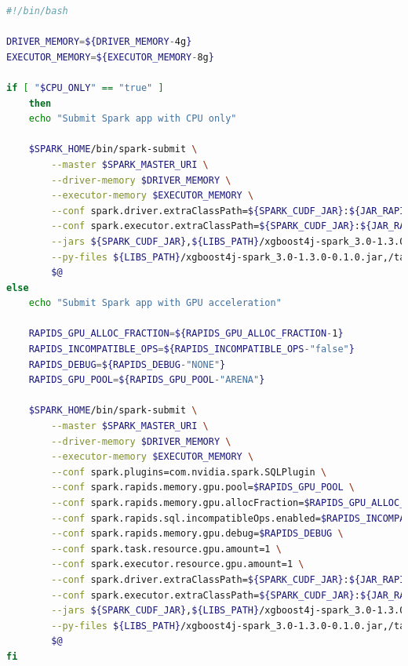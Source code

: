 \begin{lstlisting}[label=lst:appendix_spark-submit_script, caption=Custom submit script, language=sh]
#!/bin/bash
 
DRIVER_MEMORY=${DRIVER_MEMORY-4g}
EXECUTOR_MEMORY=${EXECUTOR_MEMORY-8g}
 
if [ "$CPU_ONLY" == "true" ]
    then
    echo "Submit Spark app with CPU only"
 
    $SPARK_HOME/bin/spark-submit \
        --master $SPARK_MASTER_URI \
        --driver-memory $DRIVER_MEMORY \
        --executor-memory $EXECUTOR_MEMORY \
        --conf spark.driver.extraClassPath=${SPARK_CUDF_JAR}:${JAR_RAPIDS}:${LIBS_PATH}/xgboost4j_3.0-1.3.0-0.1.0.jar:${LIBS_PATH}/xgboost4j-spark_3.0-1.3.0-0.1.0.jar \
        --conf spark.executor.extraClassPath=${SPARK_CUDF_JAR}:${JAR_RAPIDS}:${LIBS_PATH}/xgboost4j_3.0-1.3.0-0.1.0.jar:${LIBS_PATH}/xgboost4j-spark_3.0-1.3.0-0.1.0.jar \
        --jars ${SPARK_CUDF_JAR},${LIBS_PATH}/xgboost4j-spark_3.0-1.3.0-0.1.0.jar,${LIBS_PATH}/xgboost4j_3.0-1.3.0-0.1.0.jar,${JAR_RAPIDS} \
        --py-files ${LIBS_PATH}/xgboost4j-spark_3.0-1.3.0-0.1.0.jar,/tank/data/users/chh-ms/spark-xgboost-examples/examples/apps/python/samples.zip \
        $@
else
    echo "Submit Spark app with GPU acceleration"
 
    RAPIDS_GPU_ALLOC_FRACTION=${RAPIDS_GPU_ALLOC_FRACTION-1}
    RAPIDS_INCOMPATIBLE_OPS=${RAPIDS_INCOMPATIBLE_OPS-"false"}
    RAPIDS_DEBUG=${RAPIDS_DEBUG-"NONE"}
    RAPIDS_GPU_POOL=${RAPIDS_GPU_POOL-"ARENA"}
 
    $SPARK_HOME/bin/spark-submit \
        --master $SPARK_MASTER_URI \
        --driver-memory $DRIVER_MEMORY \
        --executor-memory $EXECUTOR_MEMORY \
        --conf spark.plugins=com.nvidia.spark.SQLPlugin \
        --conf spark.rapids.memory.gpu.pool=$RAPIDS_GPU_POOL \
        --conf spark.rapids.memory.gpu.allocFraction=$RAPIDS_GPU_ALLOC_FRACTION \
        --conf spark.rapids.sql.incompatibleOps.enabled=$RAPIDS_INCOMPATIBLE_OPS \
        --conf spark.rapids.memory.gpu.debug=$RAPIDS_DEBUG \
        --conf spark.task.resource.gpu.amount=1 \
        --conf spark.executor.resource.gpu.amount=1 \
        --conf spark.driver.extraClassPath=${SPARK_CUDF_JAR}:${JAR_RAPIDS}:${LIBS_PATH}/xgboost4j_3.0-1.3.0-0.1.0.jar:${LIBS_PATH}/xgboost4j-spark_3.0-1.3.0-0.1.0.jar \
        --conf spark.executor.extraClassPath=${SPARK_CUDF_JAR}:${JAR_RAPIDS}:${LIBS_PATH}/xgboost4j_3.0-1.3.0-0.1.0.jar:${LIBS_PATH}/xgboost4j-spark_3.0-1.3.0-0.1.0.jar \
        --jars ${SPARK_CUDF_JAR},${LIBS_PATH}/xgboost4j-spark_3.0-1.3.0-0.1.0.jar,${LIBS_PATH}/xgboost4j_3.0-1.3.0-0.1.0.jar,${JAR_RAPIDS} \
        --py-files ${LIBS_PATH}/xgboost4j-spark_3.0-1.3.0-0.1.0.jar,/tank/data/users/chh-ms/spark-xgboost-examples/examples/apps/python/samples.zip \
        $@  
fi
\end{lstlisting}


